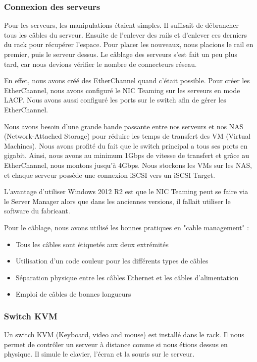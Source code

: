 \subsubsection{Connexion des serveurs}
Pour les serveurs, les manipulations étaient simples. 
Il suffisait de débrancher tous les câbles du serveur.
Ensuite de l'enlever des rails et d'enlever ces derniers du rack pour récupérer l'espace.
Pour placer les nouveaux, nous placions le rail en premier, puis le serveur dessus.
Le câblage des serveurs s'est fait un peu plus tard, car nous devions vérifier le nombre de connecteurs réseau. 

En effet, nous avons créé des EtherChannel quand c'était possible.
Pour créer les EtherChannel, nous avons configuré le NIC Teaming sur les serveurs en mode LACP.
Nous avons aussi configuré les ports sur le switch afin de gérer les EtherChannel.
 
Nous avons besoin d'une grande bande passante entre nos serveurs et nos NAS (Network-Attached Storage) pour réduire les temps de transfert des VM (Virtual Machines).
Nous avons profité du fait que le switch principal a tous ses ports en gigabit. 
Ainsi, nous avons au minimum 1Gbps de vitesse de transfert et grâce au EtherChannel, nous montons jusqu'à 4Gbps.
Nous stockons les VMs sur les NAS, et chaque serveur possède une connexion iSCSI vers un iSCSI Target. 

L'avantage d'utiliser Windows 2012 R2 est que le NIC Teaming peut se faire via le Server Manager alors que dans les anciennes versions, il fallait utiliser le software du fabricant.


Pour le câblage, nous avons utilisé les bonnes pratiques en "cable management" :  
\begin{itemize}
\item Tous les câbles sont étiquetés aux deux extrémités
\item Utilisation d'un code couleur pour les différents types de câbles
\item Séparation physique entre les câbles Ethernet et les câbles d'alimentation
\item Emploi de câbles de bonnes longueurs
\end{itemize}

\subsubsection{Switch KVM}
Un switch KVM (Keyboard, video and mouse) est installé dans le rack.
Il nous permet de contrôler un serveur à distance comme si nous étions dessus en physique.
Il simule le clavier, l'écran et la souris sur le serveur. 

